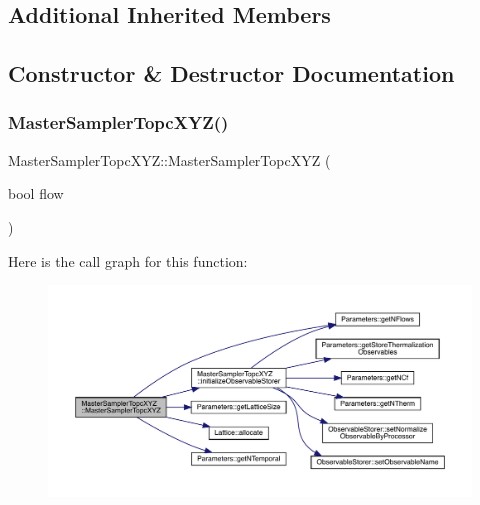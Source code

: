 \subsection*{Additional Inherited Members}


\subsection{Constructor \& Destructor Documentation}
\mbox{\label{class_master_sampler_topc_x_y_z_ad8ba8f2c50c66d823c551f71fd62a99b}} 
\subsubsection{\texorpdfstring{MasterSamplerTopcXYZ()}{MasterSamplerTopcXYZ()}}
{\footnotesize\ttfamily Master\+Sampler\+Topc\+X\+Y\+Z\+::\+Master\+Sampler\+Topc\+X\+YZ (\begin{DoxyParamCaption}\item[{bool}]{flow }\end{DoxyParamCaption})}

Here is the call graph for this function\+:\nopagebreak
\begin{figure}[H]
\begin{center}
\leavevmode
\includegraphics[width=350pt]{class_master_sampler_topc_x_y_z_ad8ba8f2c50c66d823c551f71fd62a99b_cgraph}
\end{center}
\end{figure}
\mbox{\label{class_master_sampler_topc_x_y_z_a7e896952c909a1f29f97e0ef4c52d348}} 
